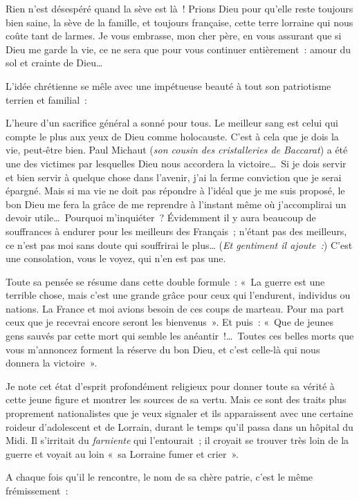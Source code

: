 \documentclass[french,twoside]{book} %
\newenvironment{quoteblock}%
  {\begin{quoting}}
  {\end{quoting}}
\newenvironment{quotebar}{%
    \def\FrameCommand{{\color{rubric!10!}\vrule width 0.5em} \hspace{0.9em}}%
    \def\OuterFrameSep{\itemsep} %
    \MakeFramed {\advance\hsize-\width \FrameRestore}
  }%
  {%
    \endMakeFramed
  }
\renewenvironment{quoteblock}%
  {%
    \savenotes
    \setstretch{0.9}
    \normalfont
    \begin{quotebar}
  }
  {%
    \end{quotebar}
    \spewnotes
  }
\begin{document}
\begin{quoteblock}
 \noindent Rien n’est désespéré quand la sève est là ! Prions Dieu pour qu’elle reste toujours bien saine, la sève de la famille, et toujours française, cette terre lorraine qui nous coûte tant de larmes. Je vous embrasse, mon cher père, en vous assurant que si Dieu me garde la vie, ce ne sera que pour vous continuer entièrement : amour du sol et crainte de Dieu…‌
 \end{quoteblock}

\noindent L’idée chrétienne se mêle avec une impétueuse beauté à tout son patriotisme terrien et familial :‌\par

\begin{quoteblock}
 \noindent L’heure d’un sacrifice général a sonné pour tous. Le meilleur sang est celui qui compte le plus aux yeux de Dieu comme holocauste. C’est à cela que je dois la vie, peut-être bien. Paul Michaut ({\itshape son cousin des cristalleries de Baccarat}) a été une des victimes par lesquelles Dieu nous accordera la victoire… Si je dois servir et bien servir à quelque chose dans l’avenir, j’ai la ferme conviction que je serai épargné. Mais si ma vie ne doit pas répondre à l’idéal que je me suis proposé, le bon Dieu me fera la grâce de me reprendre à l’instant même où j’accomplirai un devoir utile… Pourquoi m’inquiéter ? Évidemment il y aura beaucoup de souffrances à endurer pour les meilleurs des Français ; n’étant pas des meilleurs, ce n’est pas moi sans doute qui souffrirai le plus… ({\itshape Et gentiment il ajoute :}) C’est une consolation, vous le voyez, qui n’en est pas une.‌
 \end{quoteblock}

\noindent Toute sa pensée se résume dans cette double formule : « La guerre est une terrible chose, mais c’est une grande grâce pour ceux qui l’endurent, individus ou nations. La France et moi avions besoin de ces coups de marteau. Pour ma part ceux que je recevrai encore seront les bienvenus ». Et puis : « Que de jeunes gens sauvés par cette mort qui semble les anéantir !… Toutes ces belles morts que vous m’annoncez forment la réserve du bon Dieu, et c’est celle-là qui nous donnera la victoire ».‌\par
Je note cet état d’esprit profondément religieux pour donner toute sa vérité à cette jeune figure et montrer les sources de sa vertu. Mais ce sont des traits plus proprement nationalistes que je veux signaler et ils apparaissent avec une certaine roideur d’adolescent et de Lorrain, durant le temps qu’il passa dans un hôpital du Midi. Il s’irritait du {\itshape farniente} qui l’entourait ; il croyait se trouver très loin de la guerre et voyait au loin « sa Lorraine fumer et crier ».‌\par
A chaque fois qu’il le rencontre, le nom de sa chère patrie, c’est le même frémissement :‌\par
\end{document}
